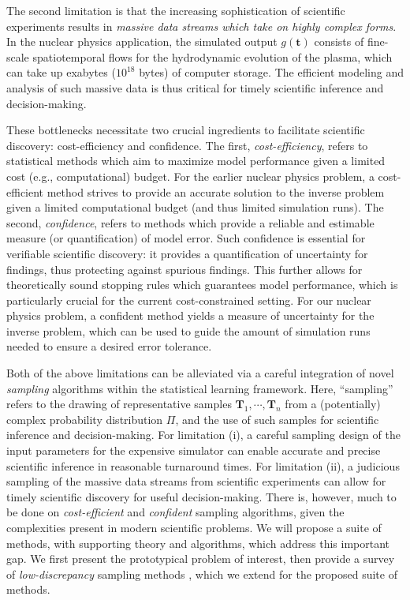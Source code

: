 \documentclass[11pt]{NSFamsart}
\newcommand{\cmtS}[1]{{\color{blue}{(Simon: #1)}}}
\newcommand{\bt}{{\boldsymbol{t}}}
\newcommand{\bT}{{\boldsymbol{T}}}
\begin{document}
The second limitation is that the increasing sophistication of scientific experiments results in \textit{massive data streams which take on highly complex forms}. In the nuclear physics application, the simulated output $g(\bt)$ consists of fine-scale spatiotemporal flows for the hydrodynamic evolution of the plasma, which can take up exabytes ($10^{18}$ bytes) of computer storage. The efficient modeling and analysis of such massive data is thus critical for timely scientific inference and decision-making. \cmtS{UAV application}

These bottlenecks necessitate two crucial ingredients to facilitate scientific discovery: cost-efficiency and confidence. The first, \textit{cost-efficiency}, refers to statistical methods which aim to maximize model performance given a limited cost (e.g., computational) budget. For the earlier nuclear physics problem, a cost-efficient method strives to provide an accurate solution to the inverse problem given a limited computational budget (and thus limited simulation runs). The second, \textit{confidence}, refers to methods which provide a reliable and estimable measure (or quantification) of model error. Such confidence is essential for verifiable scientific discovery: it provides a quantification of uncertainty for findings, thus protecting against spurious findings. This further allows for theoretically sound stopping rules which guarantees model performance, which is particularly crucial for the current cost-constrained setting. For our nuclear physics problem, a confident method yields a measure of uncertainty for the inverse problem, which can be used to guide the amount of simulation runs needed to ensure a desired error tolerance.

Both of the above limitations can be alleviated via a careful integration of novel \textit{sampling} algorithms within the statistical learning framework. Here, ``sampling'' refers to the drawing of representative samples $\bT_1, \cdots, \bT_n$ from a (potentially) complex probability distribution $\Pi$, and the use of such samples for scientific inference and decision-making. For limitation (i), a careful sampling design of the input parameters for the expensive simulator can enable accurate and precise scientific inference in reasonable turnaround times. For limitation (ii), a judicious sampling of the massive data streams from scientific experiments can allow for timely scientific discovery for useful decision-making. There is, however, much to be done on \textit{cost-efficient} and \textit{confident} sampling algorithms, given the complexities present in modern scientific problems. We will propose a suite of methods, with supporting theory and algorithms, which address this important gap. We first present the prototypical problem of interest, then provide a survey of \textit{low-discrepancy} sampling methods \citep{niederreiter1992random}, which we extend for the proposed suite of methods.
\end{document}
